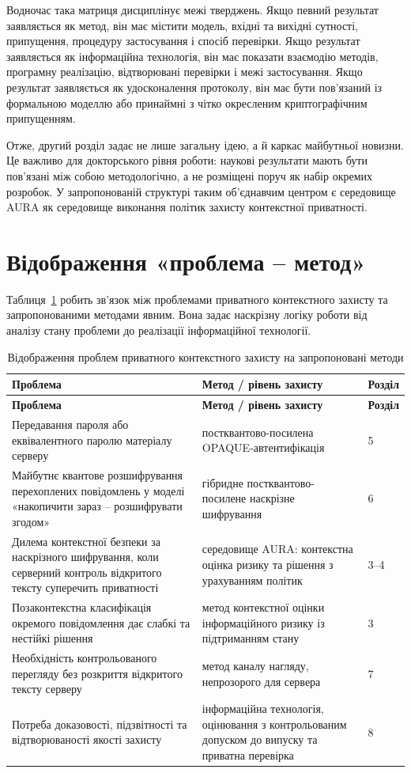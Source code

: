 Водночас така матриця дисциплінує межі тверджень. Якщо певний результат заявляється як метод, він має містити модель, вхідні та вихідні сутності, припущення, процедуру застосування і спосіб перевірки. Якщо результат заявляється як інформаційна технологія, він має показати взаємодію методів, програмну реалізацію, відтворювані перевірки і межі застосування. Якщо результат заявляється як удосконалення протоколу, він має бути пов'язаний із формальною моделлю або принаймні з чітко окресленим криптографічним припущенням.

Отже, другий розділ задає не лише загальну ідею, а й каркас майбутньої новизни. Це важливо для докторського рівня роботи: наукові результати мають бути пов'язані між собою методологічно, а не розміщені поруч як набір окремих розробок. У запропонованій структурі таким об'єднавчим центром є середовище AURA як середовище виконання політик захисту контекстної приватності.

\section{Відображення «проблема -- метод»}
\label{sec:problem-method-map}

Таблиця~\ref{tab:problem-method} робить зв'язок між проблемами приватного контекстного захисту та запропонованими методами явним. Вона задає наскрізну логіку роботи від аналізу стану проблеми до реалізації інформаційної технології.

\begin{longtable}{p{6.0cm} p{6.0cm} p{1.6cm}}
\caption{Відображення проблем приватного контекстного захисту на запропоновані методи}
\label{tab:problem-method}\\
\toprule
\textbf{Проблема} & \textbf{Метод / рівень захисту} & \textbf{Розділ} \\
\midrule
\endfirsthead
\toprule
\textbf{Проблема} & \textbf{Метод / рівень захисту} & \textbf{Розділ} \\
\midrule
\endhead
Передавання пароля або еквівалентного паролю матеріалу серверу & постквантово-посилена OPAQUE-автентифікація & 5 \\
Майбутнє квантове розшифрування перехоплених повідомлень у моделі «накопичити зараз -- розшифрувати згодом» & гібридне постквантово-посилене наскрізне шифрування & 6 \\
Дилема контекстної безпеки за наскрізного шифрування, коли серверний контроль відкритого тексту суперечить приватності & середовище AURA: контекстна оцінка ризику та рішення з урахуванням політик & 3--4 \\
Позаконтекстна класифікація окремого повідомлення дає слабкі та нестійкі рішення & метод контекстної оцінки інформаційного ризику із підтриманням стану & 3 \\
Необхідність контрольованого перегляду без розкриття відкритого тексту серверу & метод каналу нагляду, непрозорого для сервера & 7 \\
Потреба доказовості, підзвітності та відтворюваності якості захисту & інформаційна технологія, оцінювання з контрольованим допуском до випуску та приватна перевірка & 8 \\
\bottomrule
\end{longtable}

